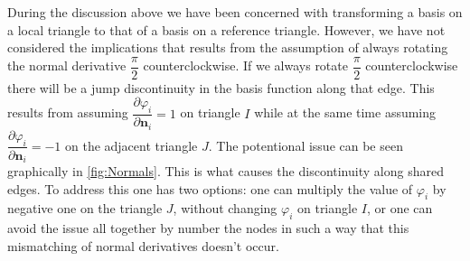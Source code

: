 During the discussion above we have been concerned with transforming a basis on
a local triangle to that of a basis on a reference triangle. However, we have
not considered the implications that results from the assumption of always
rotating the normal derivative $\dfrac{\pi}{2}$ counterclockwise.  If we always
rotate $\dfrac{\pi}{2}$ counterclockwise there will be a jump discontinuity in
the basis function along that edge.  This results from assuming
$\dfrac{\partial\varphi_i}{\partial\mathbf{n}_i} = 1$ on triangle $I$ while at
the same time assuming $\dfrac{\partial\varphi_i}{\partial\mathbf{n}_i} = -1$ on
the adjacent triangle $J$. The potentional issue can be seen graphically in
\autoref{fig:Normals}. This is what causes the discontinuity along shared edges.
To address this one has two options: one can multiply the value of $\varphi_i$ by
negative one on the triangle $J$, without changing $\varphi_i$ on triangle
$I$, or one can avoid the issue all together by number the nodes in such a way
that this mismatching of normal derivatives doesn't occur.




